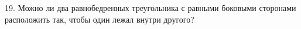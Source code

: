 19. Можно ли два равнобедренных треугольника с равными боковыми сторонами расположить так, чтобы один лежал внутри другого?\\
